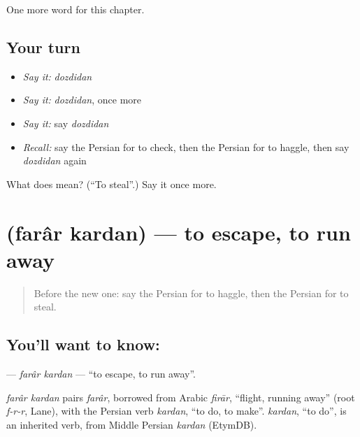\begin{grammarlens}[title={What you've built}]
One more word for this chapter.
\end{grammarlens}

\subsection*{Your turn}
\begin{itemize}
\raggedright
  \item \emph{Say it:} \emph{dozdidan}
  \item \emph{Say it:} \emph{dozdidan}, once more
  \item \emph{Say it:} say \emph{dozdidan}
  \item \emph{Recall:} say the Persian for to check, then the Persian for to haggle, then say \emph{dozdidan} again
\end{itemize}

\begin{tcolorbox}[breakable,colback=teal!4,colframe=teal!35!black,title={Before you move on}]
What does  mean? (\textquotedblleft{}To steal\textquotedblright{}.) Say it once more.
\end{tcolorbox}
\section[\texorpdfstring{\fa{فرار} \fa{کردن} (farâr kardan)}{فرار کردن (farâr kardan)}]{  (farâr kardan) — to escape, to run away}

\label{lesson:FA-C259-farar-kardan}



\begin{quote}
Before the new one: say the Persian for to haggle, then the Persian for to steal.
\end{quote}

\subsection*{You'll want to know:  }
\textbf{ } — \emph{farâr kardan} — \textquotedblleft{}to escape, to run away\textquotedblright{}.

\begin{cousinweb}
\emph{farâr kardan} pairs \emph{farâr}, borrowed from Arabic \emph{firār}, \textquotedblleft{}flight, running away\textquotedblright{} (root \emph{f-r-r}, Lane), with the Persian verb \emph{kardan}, \textquotedblleft{}to do, to make\textquotedblright{}. \emph{kardan}, \textquotedblleft{}to do\textquotedblright{}, is an inherited verb, from Middle Persian \emph{kardan} (EtymDB).
\end{cousinweb}

